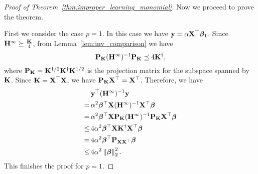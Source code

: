 \begin{proof}[Proof of Theorem~\ref{thm:improper_learning_monomial}]
	
	
	Now we proceed to prove the theorem.
	
	
	First we consider the case $p=1$. In this case we have $\mathbf{y} =\alpha \mathbf{X}^\top \bm{\beta}_1$. Since $\mathbf{H}^\infty \succeq \frac{\mathbf{K}}{4}$,
	 from Lemma~\ref{lem:inv_comparison} we have 
	\[ \mathbf{P}_{\mathbf{K}} (\mathbf{H}^{\infty})^{-1} \mathbf{P}_{\mathbf{K}} \preceq 4\mathbf{K}^\dag,\]
	where $\mathbf{P}_{\mathbf{K}} = \mathbf{K}^{1/2}\mathbf{K}^\dag \mathbf{K}^{1/2}$ is the projection matrix for the subspace spanned by $\mathbf{K}$. Since $\mathbf{K} = \mathbf{X}^\top \mathbf{X}$, we have $\mathbf{P}_{\mathbf{K}}\mathbf{X}^\top = \mathbf{X}^\top$. 
	Therefore, we have
	\begin{align*}
	&\mathbf{y}^\top (\mathbf{H}^{\infty})^{-1}  \mathbf{y}\\
	 =\, &\alpha^2 \bm{\beta}^\top \mathbf{X} (\mathbf{H}^{\infty})^{-1}  \mathbf{X}^\top \bm{\beta} \\
	=\,&\alpha^2  \bm{\beta}^\top \mathbf{X} \mathbf{P}_{\mathbf{K}}(\mathbf{H}^{\infty})^{-1} \mathbf{P}_{\mathbf{K}} \mathbf{X}^\top \bm{\beta}\\
	 \le\, & 4\alpha^2 \bm{\beta}^\top \mathbf{X} \mathbf{K}^\dag \mathbf{X}^\top \bm{\beta}  \\
	 =\, &4\alpha^2 \bm{\beta}^\top \mathbf{P}_{\mathbf{X} \mathbf{X}^\top}\bm{\beta}\\
	 \le\,& 4\alpha^2 \left\|\bm{\beta}\right\|_2^2.
	\end{align*}
	This finishes the proof for $p=1$.
	 

\end{proof}
